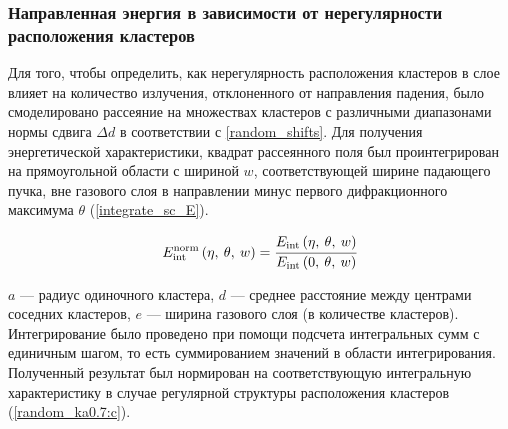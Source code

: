 

\subsubsection{Направленная энергия в зависимости от нерегулярности расположения кластеров}

Для того, чтобы определить, как нерегулярность расположения кластеров в слое влияет на количество излучения, отклоненного от направления падения, было смоделировано рассеяние на множествах кластеров с различными диапазонами нормы сдвига $\Delta d$ в соответствии с \autoref{random_shifts}. Для получения энергетической характеристики, квадрат рассеянного поля был проинтегрирован на прямоугольной области с шириной $w$, соответствующей ширине падающего пучка, вне газового слоя в направлении минус первого дифракционного максимума $\theta$ (\autoref{integrate_sc_E}).

    \begin{equation}
        E_{\textrm{int}}^{\textrm{norm}} \left(\eta,\:\theta,\:w \right) = \cfrac{E_{\textrm{int}} \left(\eta,\:\theta,\:w \right)}{E_{\textrm{int}} \left(0,\:\theta,\:w \right)}
        \label{integrate_sc_E}
    \end{equation}

 $a$ --- радиус одиночного кластера, $d$ --- среднее расстояние между центрами соседних кластеров, $e$ --- ширина газового слоя (в количестве кластеров). Интегрирование было проведено при помощи подсчета интегральных сумм с единичным шагом, то есть суммированием значений в области интегрирования. Полученный результат был нормирован на соответствующую интегральную характеристику в случае регулярной структуры расположения кластеров (\autoref{random_ka0.7:c}).

